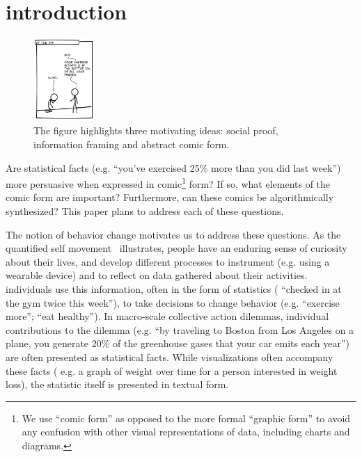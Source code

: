 



\section{introduction}
\label{sec:introduction}

\begin{figure}
    \centering
    \includegraphics[width=0.21\textwidth]{figures/intro_new.png}
  \vspace{-10pt}
  \caption{The figure highlights three motivating ideas: social proof, information framing and abstract comic form.}
  \vspace{-10pt}
\end{figure}

Are statistical facts (e.g. ``you've exercised 25\% more than you did last week'') more persuasive when expressed in comic\footnote{We use ``comic form'' as opposed to the more formal ``graphic form'' to avoid any confusion with other visual representations of data, including charts and diagrams.} form? If so, what elements of the comic form are important? Furthermore, can these comics be algorithmically synthesized? This paper plans to address each of these questions.

The notion of behavior change motivates us to address these questions. As the quantified self movement~\cite{Epstein2014,Choe2014} illustrates, people have an enduring sense of curiosity about their lives, and develop different processes to instrument (e.g. using a wearable device) and to reflect on data gathered about their activities. individuals use this information, often in the form of statistics ( ``checked in at the gym twice this week''), to take decisions to change behavior (e.g. ``exercise more''; ``eat healthy''). In macro-scale collective action dilemmas, individual contributions to the dilemma (e.g. ``by traveling to Boston from Los Angeles on a plane, you generate 20\% of the greenhouse gases that your car emits each year'') are often presented as statistical facts. While visualizations often accompany these facts ( e.g. a graph of weight over time for a person interested in weight loss), the statistic itself is presented in textual form.

